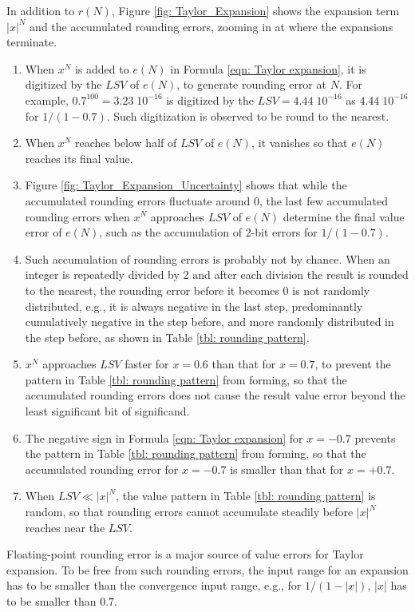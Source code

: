\documentclass[twoside]{article}
\numberwithin{equation}{section}
\begin{document}
In addition to $r(N)$, Figure \ref{fig: Taylor_Expansion} shows the expansion term $|x|^N$ and the accumulated rounding errors, zooming in at where the expansions terminate.
\begin{enumerate}
\item When $x^N$ is added to $e(N)$ in Formula \eqref{eqn: Taylor expansion}, it is digitized by the $LSV$ of $e(N)$, to generate rounding error at $N$.
For example, $0.7^{100}=3.23\; 10^{-16}$ is digitized by the $LSV=4.44\; 10^{-16}$ as $4.44\; 10^{-16}$ for $1/(1 - 0.7)$.
Such digitization is observed to be round to the nearest.

\item When $x^N$ reaches below half of $LSV$ of $e(N)$, it vanishes so that $e(N)$ reaches its final value.

\item Figure \ref{fig: Taylor_Expansion_Uncertainty} shows that while the accumulated rounding errors fluctuate around $0$, the last few accumulated rounding errors when $x^N$ approaches $LSV$ of $e(N)$ determine the final value error of $e(N)$, such as the accumulation of 2-bit errors for $1/(1 - 0.7)$.

\item Such accumulation of rounding errors is probably not by chance.
When an integer is repeatedly divided by $2$ and after each division the result is rounded to the nearest, the rounding error before it becomes $0$ is not randomly distributed, e.g., it is always negative in the last step, predominantly cumulatively negative in the step before, and more randomly distributed in the step before, as shown in Table \ref{tbl: rounding pattern}.

\item $x^N$ approaches $LSV$ faster for $x = 0.6$ than that for $x = 0.7$, to prevent the pattern in Table \ref{tbl: rounding pattern} from forming, so that the accumulated rounding errors does not cause the result value error beyond the least significant bit of significand.

\item The negative sign in Formula \eqref{eqn: Taylor expansion} for $x =-0.7$ prevents the pattern in Table \ref{tbl: rounding pattern} from forming, so that the accumulated rounding error for $x =-0.7$ is smaller than that for $x = +0.7$.

\item When $LSV \ll |x|^N$, the value pattern in Table \ref{tbl: rounding pattern} is random, so that rounding errors cannot accumulate steadily before $|x|^N$ reaches near the $LSV$.

\end{enumerate}
Floating-point rounding error is a major source of value errors for Taylor expansion.
To be free from such rounding errors, the input range for an expansion has to be smaller than the convergence input range, e.g., for $1/(1 -|x|)$, $|x|$ has to be smaller than $0.7$.
\end{document}
